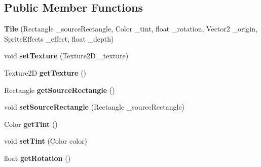 \subsection*{Public Member Functions}
\begin{DoxyCompactItemize}
\item 
\hypertarget{class_tile_engine_1_1_tile_a51f908f77d3210fd3397a844d90dbdb2}{{\bfseries Tile} (Rectangle \-\_\-source\-Rectangle, Color \-\_\-tint, float \-\_\-rotation, Vector2 \-\_\-origin, Sprite\-Effects \-\_\-effect, float \-\_\-depth)}\label{d6/d07/class_tile_engine_1_1_tile_a51f908f77d3210fd3397a844d90dbdb2}

\item 
\hypertarget{class_tile_engine_1_1_tile_aaf5725a5761dda6ed078ef8825167124}{void {\bfseries set\-Texture} (Texture2\-D \-\_\-texture)}\label{d6/d07/class_tile_engine_1_1_tile_aaf5725a5761dda6ed078ef8825167124}

\item 
\hypertarget{class_tile_engine_1_1_tile_a539bc2583deb9ea015d2d9ac39ef6531}{Texture2\-D {\bfseries get\-Texture} ()}\label{d6/d07/class_tile_engine_1_1_tile_a539bc2583deb9ea015d2d9ac39ef6531}

\item 
\hypertarget{class_tile_engine_1_1_tile_a6c32d6adf8a567aee16e30c311f8d7a4}{Rectangle {\bfseries get\-Source\-Rectangle} ()}\label{d6/d07/class_tile_engine_1_1_tile_a6c32d6adf8a567aee16e30c311f8d7a4}

\item 
\hypertarget{class_tile_engine_1_1_tile_ad4ef504ed53ad6b2f5c7155d765d9d74}{void {\bfseries set\-Source\-Rectangle} (Rectangle \-\_\-source\-Rectangle)}\label{d6/d07/class_tile_engine_1_1_tile_ad4ef504ed53ad6b2f5c7155d765d9d74}

\item 
\hypertarget{class_tile_engine_1_1_tile_a8a2254bf9d9d822f1ca42d32b9f88b2d}{Color {\bfseries get\-Tint} ()}\label{d6/d07/class_tile_engine_1_1_tile_a8a2254bf9d9d822f1ca42d32b9f88b2d}

\item 
\hypertarget{class_tile_engine_1_1_tile_acd94a9cd2f8641284afd91c8ccd60119}{void {\bfseries set\-Tint} (Color color)}\label{d6/d07/class_tile_engine_1_1_tile_acd94a9cd2f8641284afd91c8ccd60119}

\item 
\hypertarget{class_tile_engine_1_1_tile_a37fd2a1887b7961fec064bd32f7aed94}{float {\bfseries get\-Rotation} ()}\label{d6/d07/class_tile_engine_1_1_tile_a37fd2a1887b7961fec064bd32f7aed94}


\end{DoxyCompactItemize}
